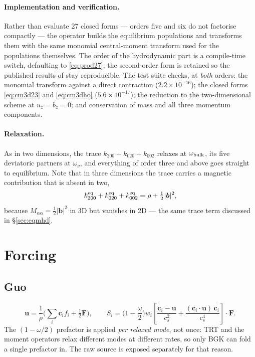 \documentclass[11pt,a4paper]{article}
\newcommand{\cs}{c_s}
\newcommand{\ci}{\bm{c}_i}
\newcommand{\uu}{\bm{u}}
\newcommand{\bb}{\bm{b}}
\begin{document}
\paragraph{Implementation and verification.} Rather than evaluate 27 closed
forms --- orders five and six do not factorise compactly --- the operator builds
the equilibrium populations and transforms them with the same monomial
central-moment transform used for the populations themselves. The order of the
hydrodynamic part is a compile-time switch, defaulting to \eqref{eq:prod27}; the
second-order form is retained so the published results of \cite{derosis2018}
stay reproducible. The test suite checks, at \emph{both} orders: the monomial
transform against a direct contraction ($2.2\times10^{-16}$); the closed forms
\eqref{eq:cm3d23} and \eqref{eq:cm3dho} ($5.6\times10^{-17}$); the reduction to
the two-dimensional scheme at $u_z=b_z=0$; and conservation of mass and all three
momentum components.

\paragraph{Relaxation.} As in two dimensions, the trace
$k_{200}+k_{020}+k_{002}$ relaxes at $\omega_{\rm bulk}$, its five deviatoric
partners at $\omega_\nu$, and everything of order three and above goes straight
to equilibrium. Note that in three dimensions the trace carries a magnetic
contribution that is absent in two,
\begin{equation}
  k_{200}^{\rm eq}+k_{020}^{\rm eq}+k_{002}^{\rm eq} = \rho + \tfrac12|\bb|^2,
\end{equation}
because $M_{\alpha\alpha}=\tfrac12|\bb|^2$ in 3D but vanishes in 2D --- the same
trace term discussed in \S\ref{sec:eqmhd}.

\section{Forcing}

\subsection{Guo}

\begin{equation}
  \uu = \frac{1}{\rho}\Big(\sum_i \ci f_i + \tfrac12\bm{F}\Big), \qquad
  S_i = \Big(1-\frac{\omega}{2}\Big) w_i
    \left[\frac{\ci-\uu}{\cs^2} + \frac{(\ci\!\cdot\!\uu)\,\ci}{\cs^4}\right]\!\cdot\bm{F}.
  \label{eq:guo}
\end{equation}
The $(1-\omega/2)$ prefactor is applied \emph{per relaxed mode}, not once: TRT and
the moment operators relax different modes at different rates, so only BGK can
fold a single prefactor in. The raw source is exposed separately for that reason.
\end{document}
